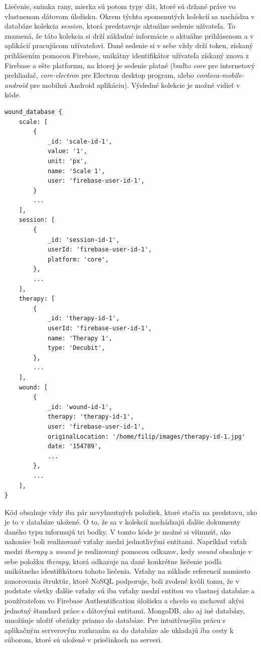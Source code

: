 Liečenie, snímka rany, mierka sú potom typy dát, ktoré sú držané práve vo vlastnenom dátovom úložisku. Okrem týchto spomenutých kolekcií sa nachádza v databáze kolekcia  \textit{session}, ktorá predstavuje aktuálne sedenie užívateľa. To znamená, že táto kolekcia si drží základné informácie o aktuálne prihlásenom a v aplikácií pracujúcom užívateľovi. Dané sedenie si v sebe vždy drží token, získaný prihlásením pomocou Firebase, unikátny identifikátor užívateľa získaný znova z Firebase a ešte platformu, na ktorej je sedenie platné (buďto  \textit{core} pre internetový prehliadač,  \textit{core-electron} pre Electron desktop program, alebo  \textit{cordova-mobile-android} pre mobilnú Android aplikáciu). Výsledné kolekcie je možné vidieť v kóde.
\begin{lstlisting}[caption={Finálna štruktúra databáze},captionpos=b]
wound_database {
    scale: [
        {
            _id: 'scale-id-1',
            value: '1',
            unit: 'px',
            name: 'Scale 1',
            user: 'firebase-user-id-1',
        }
        ...
    ],
    session: [
        {
            _id: 'session-id-1',
            userId: 'firebase-user-id-1',
            platform: 'core',
        },
        ...
    ],
    therapy: [
        {
            _id: 'therapy-id-1',
            userId: 'firebase-user-id-1',
            name: 'Therapy 1',
            type: 'Decubit',
        },
        ...
    ],
    wound: [
        {
            _id: 'wound-id-1',
            therapy: 'therapy-id-1',
            user: 'firebase-user-id-1',
            originalLocation: '/home/filip/images/therapy-id-1.jpg'
            date: '154789',
            ...
        },
        ...
    ],
}
\end{lstlisting}
Kód obsahuje vždy iba pár nevyhnutných položiek, ktoré stačia na predstavu, ako je to v databáze uložené. O to, že sa v kolekcií nachádzajú ďalšie dokumenty daného typu informujú tri bodky. V tomto kóde je možné si všimnúť, ako nakoniec boli realizované vzťahy medzi jednotlivými entitami. Napríklad vzťah medzi  \textit{therapy} a  \textit{wound} je realizovaný pomocou odkazov, kedy  \textit{wound} obsahuje v sebe položku  \textit{therapy}, ktorá odkazuje na dané konkrétne liečenie podľa unikátneho identifikátoru tohoto liečenia. Vzťahy na základe referencií namiesto zanorovania štruktúr, ktoré NoSQL podporuje, boli zvolené kvôli tomu, že v podstate všetky ďalšie vzťahy sú iba vzťahy medzi entitou vo vlastnej databáze a používateľom vo Firebase Authentification úložisku a chcelo sa zachovať akýsi jednotný štandard práce s dátovými entitami.  MongoDB, ako aj iné databázy, umožňuje uložiť obrázky priamo do databáze. Pre intuitívnejšiu prácu s aplikačným serverovým rozhraním sa do databáze ale ukladajú iba cesty k súborom, ktoré sú uložené v priečinkoch na serveri.

